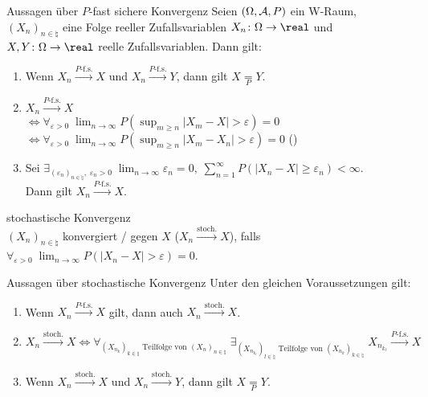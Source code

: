 \begin{Satz}{Aussagen über $P$-fast sichere Konvergenz}
    Seien $(\Omega, \mathcal{A}, P)$ ein W-Raum,
    $(X_n)_{n \in \natural}$ eine Folge reeller Zufallsvariablen
    $X_n\colon \Omega \rightarrow \real$ und
    $X, Y\colon \Omega \rightarrow \real$ reelle Zufallsvariablen.
    Dann gilt:
    \begin{enumerate}
        \item
        Wenn $X_n \xrightarrow{P\text{-f.s.}} X$ und $X_n \xrightarrow{P\text{-f.s.}} Y$,
        dann gilt $X \underset{P}{=} Y$.
        
        \item
        $X_n \xrightarrow{P\text{-f.s.}} X$\\
        $\iff \forall_{\varepsilon > 0}\; \lim_{n \to \infty}
        P(\sup_{m \ge n} |X_m - X| > \varepsilon) = 0$\\
        $\iff \forall_{\varepsilon > 0}\; \lim_{n \to \infty}
        P(\sup_{m \ge n} |X_m - X_n| > \varepsilon) = 0$
        ()
        
        \item
        Sei $\exists_{(\varepsilon_n)_{n \in \natural},\; \varepsilon_n > 0}\;
        \lim_{n \to \infty} \varepsilon_n = 0,\;
        \sum_{n=1}^\infty P(|X_n - X| \ge \varepsilon_n) < \infty$.\\
        Dann gilt $X_n \xrightarrow{P\text{-f.s.}} X$.
    \end{enumerate}
\end{Satz}

\linie

\begin{Def}{stochastische Konvergenz}\\
    $(X_n)_{n \in \natural}$ konvergiert / gegen $X$
    ($X_n \xrightarrow{\text{stoch.}} X$), falls\\
    $\forall_{\varepsilon > 0}\; \lim_{n \to \infty} P(|X_n - X| > \varepsilon) = 0$.
\end{Def}

\begin{Satz}{Aussagen über stochastische Konvergenz}
    Unter den gleichen Voraussetzungen gilt:
    \begin{enumerate}
        \item
        Wenn $X_n \xrightarrow{P\text{-f.s.}} X$ gilt, dann auch
        $X_n \xrightarrow{\text{stoch.}} X$.
        
        \item
        $X_n \xrightarrow{\text{stoch.}} X
        \iff \forall_{(X_{n_k})_{k \in \natural} \text{ Teilfolge von } (X_n)_{n \in \natural}}\;
        \exists_{(X_{n_{k_\ell}})_{l \in \natural} \text{ Teilfolge von }
        (X_{n_k})_{k \in \natural}}\; X_{n_{k_\ell}} \xrightarrow{P\text{-f.s.}} X$
        
        \item
        Wenn $X_n \xrightarrow{\text{stoch.}} X$ und $X_n \xrightarrow{\text{stoch.}} Y$,
        dann gilt $X \underset{P}{=} Y$.
    \end{enumerate}
\end{Satz}

